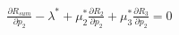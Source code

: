 \documentclass[preview]{standalone}
\begin{document}
\begin{align*}
\frac{\partial {R_{sum}}}{\partial {p_2}} - \lambda^\ast + \mu_2^\ast \frac{\partial {R_2}}{\partial {p_2}} + \mu_3^\ast \frac{\partial {R_3}}{\partial {p_2}} = 0
\end{align*}
\end{document}
